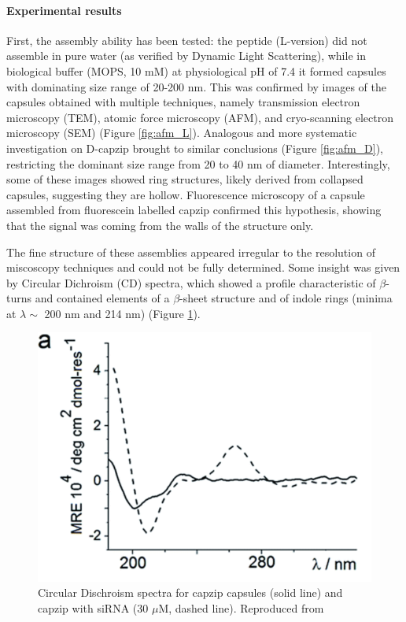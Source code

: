 \paragraph{Experimental results} First, the assembly ability has been tested: the peptide (L-version) did not assemble in pure water (as verified by Dynamic Light Scattering), while in biological buffer (MOPS, 10 mM) at physiological pH of 7.4 it formed capsules with dominating size range of 20-200 nm. This was confirmed by images of the capsules obtained with multiple techniques, namely transmission electron microscopy (TEM), atomic force microscopy (AFM), and cryo-scanning electron microscopy (SEM) (Figure \ref{fig:afm_L}).
%
Analogous and more systematic investigation on D-capzip brought to similar conclusions (Figure \ref{fig:afm_D}), restricting the dominant size range from 20 to 40 nm of diameter.
%
Interestingly, some of these images showed ring structures, likely derived from collapsed capsules, suggesting they are hollow. 
%
Fluorescence microscopy of a capsule assembled from fluorescein labelled capzip confirmed this hypothesis, showing that the signal was coming from the walls of the structure only.

The fine structure of these assemblies appeared irregular to the resolution of miscoscopy techniques and could not be fully determined. Some insight was given by Circular Dichroism (CD) spectra, which showed a profile characteristic of $\beta$-turns and contained elements of a $\beta$-sheet structure and of indole rings (minima at $\lambda \sim$ 200 nm and 214 nm) (Figure \ref{fig:exp_CD}).

\begin{figure}
\begin{center}
\includegraphics[width=0.6\linewidth, align = c]{1introduction/pics/CD_capzip.png}
\caption[Circular Dischroism specturm of capzip capsules]{Circular Dischroism spectra for capzip  capsules (solid line) and capzip with siRNA (30 $\mu$M, dashed line). Reproduced from \citep{Castelletto2016}} \label{fig:exp_CD}
\end{center}
\end{figure}

